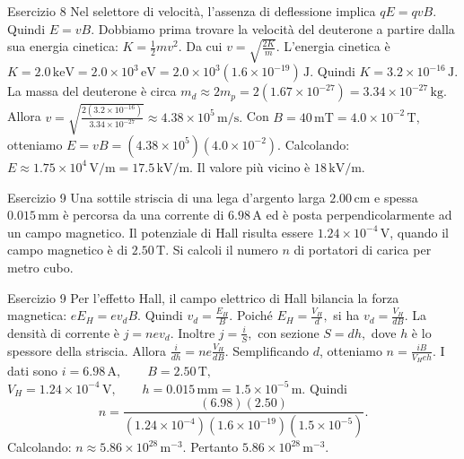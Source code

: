 \documentclass[a4paper]{article}
\begin{document}
\begin{snippetsolution}{Esercizio 8}
    Nel selettore di velocità, l'assenza di deflessione implica
    \(qE = qvB.\)
    Quindi
    \(E = vB.\)
    Dobbiamo prima trovare la velocità del deuterone a partire dalla sua
    energia cinetica:
    \(K = \frac{1}{2}mv^2.\)
    Da cui
    \(v = \sqrt{\frac{2K}{m}}.\)
    L'energia cinetica è
    \(K = 2.0\,\mathrm{keV} = 2.0 \times 10^3\,\mathrm{eV} = 2.0 \times 10^3 \left(1.6 \times 10^{-19}\right)\,\mathrm{J}.\)
    Quindi
    \(K = 3.2 \times 10^{-16}\,\mathrm{J}.\)
    La massa del deuterone è circa
    \(m_d \approx 2m_p = 2\left(1.67 \times 10^{-27}\right) = 3.34 \times 10^{-27}\,\mathrm{kg}.\)
    Allora
    \(v = \sqrt{ \frac{ 2(3.2 \times 10^{-16}) }{ 3.34 \times 10^{-27} } } \approx 4.38 \times 10^5\,\mathrm{m/s}.\)
    Con
    \(B = 40\,\mathrm{mT} = 4.0 \times 10^{-2}\,\mathrm{T},\)
    otteniamo
    \(E = vB = \left(4.38 \times 10^5\right) \left(4.0 \times 10^{-2}\right).\)
    Calcolando:
    \(E \approx 1.75 \times 10^4\,\mathrm{V/m} = 17.5\,\mathrm{kV/m}.\)
    Il valore più vicino è
    \(\boxed{18\,\mathrm{kV/m}}.\)
\end{snippetsolution}
\begin{snippetexercise}{Esercizio 9}
    Una sottile striscia di una lega d'argento larga \(2.00\,\mathrm{cm}\) e
    spessa \(0.015\,\mathrm{mm}\) è percorsa da una corrente di
    \(6.98\,\mathrm{A}\) ed è posta perpendicolarmente ad un campo magnetico.
    Il potenziale di Hall risulta essere
    \(1.24 \times 10^{-4}\,\mathrm{V}\), quando il campo magnetico è di
    \(2.50\,\mathrm{T}\). Si calcoli il numero \(n\) di portatori di carica per
    metro cubo.

\end{snippetexercise}
\begin{snippetsolution}{Esercizio 9}
    Per l'effetto Hall, il campo elettrico di Hall bilancia la forza magnetica:
    \(eE_H = ev_dB.\)
    Quindi
    \(v_d = \frac{E_H}{B}.\)
    Poiché
    \(E_H = \frac{V_H}{d},\)
    si ha
    \(v_d = \frac{V_H}{dB}.\)
    La densità di corrente è
    \(j = ne v_d.\)
    Inoltre
    \(j = \frac{i}{S},\)
    con sezione
    \(S = dh,\)
    dove \(h\) è lo spessore della striscia.
    Allora
    \(\frac{i}{dh} = ne\frac{V_H}{dB}.\)
    Semplificando \(d\), otteniamo
    \(n = \frac{iB}{V_H e h}.\)
    I dati sono
    \(i = 6.98\,\mathrm{A}, \qquad B = 2.50\,\mathrm{T},\)
    \(V_H = 1.24 \times 10^{-4}\,\mathrm{V}, \qquad h = 0.015\,\mathrm{mm} = 1.5 \times 10^{-5}\,\mathrm{m}.\)
    Quindi
    \[
        n =
        \frac{
            (6.98)(2.50)
        }{
            \left(1.24 \times 10^{-4}\right)
            \left(1.6 \times 10^{-19}\right)
            \left(1.5 \times 10^{-5}\right)
        }.
    \]
    Calcolando:
    \(n \approx 5.86 \times 10^{28}\,\mathrm{m^{-3}}.\)
    Pertanto
    \(\boxed{5.86 \times 10^{28}\,\mathrm{m^{-3}}}.\)
\end{snippetsolution}
\end{document}
